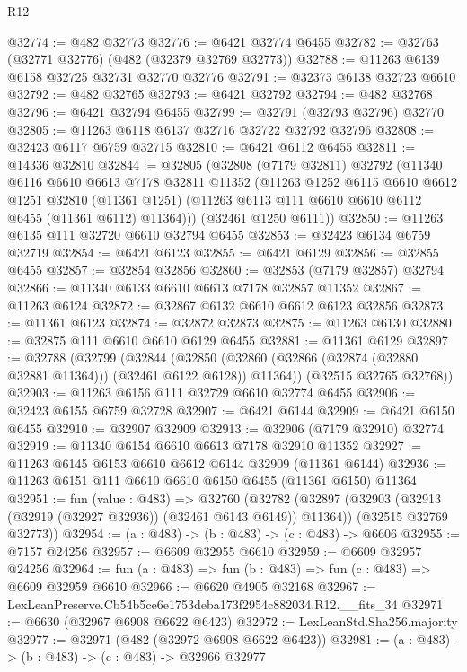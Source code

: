 \begin{lexlean}{R12}
\begin{coremodule}
@32774 := @482 @32773
@32776 := @6421 @32774 @6455
@32782 := @32763 (@32771 @32776) (@482 (@32379 @32769 @32773))
@32788 := @11263 @6139 @6158 @32725 @32731 @32770 @32776
@32791 := @32373 @6138 @32723 @6610
@32792 := @482 @32765
@32793 := @6421 @32792
@32794 := @482 @32768
@32796 := @6421 @32794 @6455
@32799 := @32791 (@32793 @32796) @32770
@32805 := @11263 @6118 @6137 @32716 @32722 @32792 @32796
@32808 := @32423 @6117 @6759 @32715
@32810 := @6421 @6112 @6455
@32811 := @14336 @32810
@32844 := @32805
    (@32808
      (@7179 @32811)
      @32792
      (@11340
        @6116
        @6610
        @6613
        @7178
        @32811
        @11352
        (@11263
          @1252
          @6115
          @6610
          @6612
          @1251
          @32810
          (@11361 @1251)
          (@11263 @6113 @111 @6610 @6610 @6112 @6455 (@11361 @6112) @11364)))
      (@32461 @1250 @6111))
@32850 := @11263 @6135 @111 @32720 @6610 @32794 @6455
@32853 := @32423 @6134 @6759 @32719
@32854 := @6421 @6123
@32855 := @6421 @6129
@32856 := @32855 @6455
@32857 := @32854 @32856
@32860 := @32853 (@7179 @32857) @32794
@32866 := @11340 @6133 @6610 @6613 @7178 @32857 @11352
@32867 := @11263 @6124
@32872 := @32867 @6132 @6610 @6612 @6123 @32856
@32873 := @11361 @6123
@32874 := @32872 @32873
@32875 := @11263 @6130
@32880 := @32875 @111 @6610 @6610 @6129 @6455
@32881 := @11361 @6129
@32897 := @32788
    (@32799
      (@32844
        (@32850 (@32860 (@32866 (@32874 (@32880 @32881 @11364))) (@32461 @6122 @6128)) @11364))
      (@32515 @32765 @32768))
@32903 := @11263 @6156 @111 @32729 @6610 @32774 @6455
@32906 := @32423 @6155 @6759 @32728
@32907 := @6421 @6144
@32909 := @6421 @6150 @6455
@32910 := @32907 @32909
@32913 := @32906 (@7179 @32910) @32774
@32919 := @11340 @6154 @6610 @6613 @7178 @32910 @11352
@32927 := @11263 @6145 @6153 @6610 @6612 @6144 @32909 (@11361 @6144)
@32936 := @11263 @6151 @111 @6610 @6610 @6150 @6455 (@11361 @6150) @11364
@32951 := fun (value : @483) =>
  @32760
    (@32782
      (@32897 (@32903 (@32913 (@32919 (@32927 @32936)) (@32461 @6143 @6149)) @11364))
      (@32515 @32769 @32773))
@32954 := (a : @483) -> (b : @483) -> (c : @483) -> @6606
@32955 := @7157 @24256
@32957 := @6609 @32955 @6610
@32959 := @6609 @32957 @24256
@32964 := fun (a : @483) => fun (b : @483) => fun (c : @483) => @6609 @32959 @6610
@32966 := @6620 @4905 @32168
@32967 := LexLeanPreserve.Cb54b5ce6e1753deba173f2954c882034.R12.__fits_34
@32971 := @6630 (@32967 @6908 @6622 @6423)
@32972 := LexLeanStd.Sha256.majority
@32977 := @32971 (@482 (@32972 @6908 @6622 @6423))
@32981 := (a : @483) -> (b : @483) -> (c : @483) -> @32966 @32977

\end{coremodule}
\end{lexlean}
